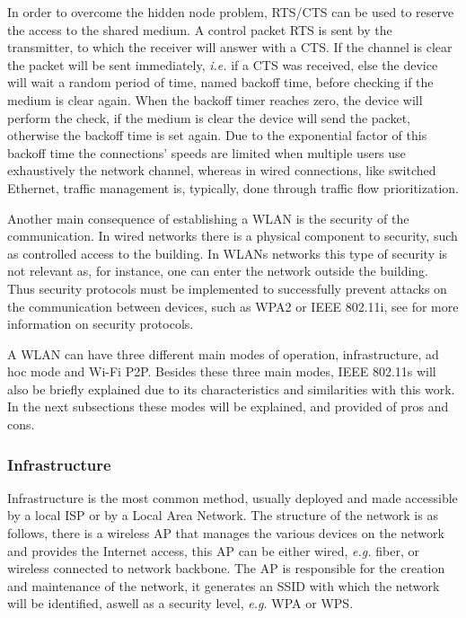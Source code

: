 In order to overcome the hidden node problem, \gls{RTS}/\gls{CTS} can be used to reserve the access to the shared medium. A control packet \gls{RTS} is sent by the transmitter, to which the receiver will answer with a \gls{CTS}. If the channel is clear the packet will be sent immediately, \textit{i.e.} if a \gls{CTS} was received, else the device will wait a random period of time, named backoff time, before checking if the medium is clear again. When the backoff timer reaches zero, the device will perform the check, if the medium is clear the device will send the packet, otherwise the backoff time is set again. Due to the exponential factor of this backoff time the connections' speeds are limited when multiple users use exhaustively the network channel, whereas in wired connections, like switched Ethernet, traffic management is, typically, done through traffic flow prioritization.

Another main consequence of establishing a \gls{WLAN} is the security of the communication. In wired networks there is a physical component to security, such as controlled access to the building. In \glspl{WLAN} networks this type of security is not relevant as, for instance, one can enter the network outside the building. Thus security protocols must be implemented to successfully prevent attacks on the communication between devices, such as WPA2 or IEEE 802.11i, see \cite{security} for more information on security protocols.

A \gls{WLAN} can have three different main modes of operation, infrastructure, ad hoc mode and Wi-Fi P2P. Besides these three main modes, IEEE 802.11s will also be briefly explained due to its characteristics and similarities with this work. In the next subsections these modes will be explained, and provided of pros and cons.

\subsubsection{Infrastructure}

Infrastructure is the most common method, usually deployed and made accessible by a local \gls{ISP} or by a Local Area Network. The structure of the network is as follows, there is a wireless \gls{AP} that manages the various devices on the network and provides the Internet access, this \gls{AP} can be either wired, \textit{e.g.} fiber, or wireless connected to network backbone. The \gls{AP} is responsible for the creation and maintenance of the network, it generates an SSID with which the network will be identified, aswell as a security level, \textit{e.g.} \gls{WPA} or \gls{WPS}.

